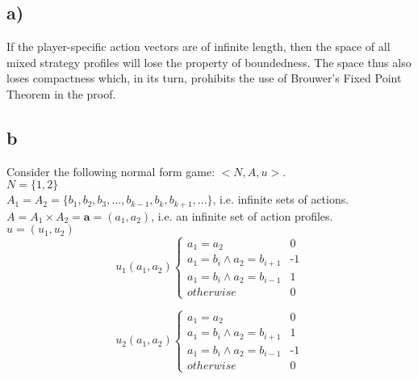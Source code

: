 \documentclass[10pt,a4paper]{article}
\begin{document}
\subsection*{a)}
If the player-specific action vectors are of infinite length, then the space of all mixed strategy profiles will lose the property of boundedness. The space thus also loses compactness which, in its turn, prohibits the use of Brouwer's Fixed Point Theorem in the proof.

\subsection*{b}
Consider the following normal form game: $<N,A,u>$.\\
$N=\{1,2\}$\\
$A_1=A_2=\{b_1,b_2,b_3,...,b_{k-1},b_{k},b_{k+1},...\}$, i.e. infinite sets of actions.
$A=A_1\times A_2=\textbf{a}=(a_1,a_2)$, i.e. an infinite set of action profiles.\\
$u=(u_1,u_2)$\\
\begin{equation*}
u_1(a_1,a_2) \begin{cases}
a_1=a_2 & \text{0}\\
a_1=b_i \land a_2=b_{i+1} & \text{-1}\\
a_1=b_i \land a_2=b_{i-1} & \text{1}\\
otherwise & \text{0}
\end{cases}
\end{equation*}

\begin{equation*}
u_2(a_1,a_2) \begin{cases}
a_1=a_2 & \text{0}\\
a_1=b_i \land a_2=b_{i+1} & \text{1}\\
a_1=b_i \land a_2=b_{i-1} & \text{-1}\\
otherwise & \text{0}
\end{cases}
\end{equation*}
\end{document}
